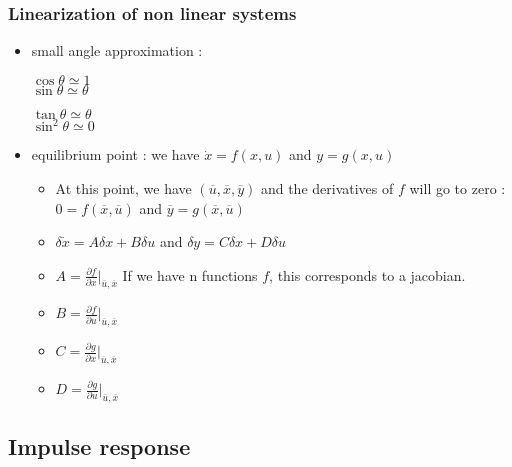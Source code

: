 \documentclass[../main.tex]{subfiles}
\begin{document}
\subsubsection{Linearization of non linear systems}
\begin{itemize}
    \item small angle approximation : \begin{minipage}{.5\textwidth}
        $\cos{\theta} \simeq 1$\\
        $\sin{\theta} \simeq \theta$\\
    \end{minipage}
    \begin{minipage}{.5\textwidth}
        $\tan{\theta} \simeq \theta$\\
        $\sin^2\theta \simeq 0$\\
    \end{minipage}
    \item equilibrium point : we have $\dot{x} = f(x,u)$ and $y=g(x,u)$\begin{itemize}
        \item At this point, we have $(\overline{u}, \overline{x}, \overline{y})$ and the derivatives of $f$ will go to zero : $0 = f(\overline{x}, \overline{u})$ and $\overline{y} = g(\overline{x}, \overline{u})$\\
        \item $\delta \dot{x} = A\delta x + B\delta u$ and $\delta y = C\delta x + D\delta u$\\
        \item $A = \frac{\partial f}{\partial x}\Biggr\rvert_{\overline{u}, \overline{x}}$ If we have n functions $f$, this corresponds to a jacobian.\\
        \item $B = \frac{\partial f}{\partial u} \biggr \rvert_{\overline{u}, \overline{x}}$\\
        \item $C = \frac{\partial g}{\partial x} \biggr \rvert_{\overline{u}, \overline{x}}$\\
        \item $D = \frac{\partial g}{\partial u} \biggr \rvert_{\overline{u}, \overline{x}}$
    \end{itemize}
\end{itemize}

\subsection{Impulse response}
\end{document}
